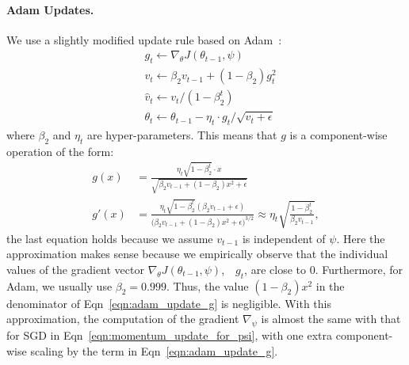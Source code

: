 \paragraph{Adam Updates.} We use a slightly modified update rule based on Adam~\citep{adam}:
\begin{equation}
  \label{eqn:adam_update}
  \begin{aligned}
    &g_t \leftarrow \nabla_\theta J(\theta_{t-1}, \psi) \\
    &v_t \leftarrow \beta_2 v_{t-1} + (1 - \beta_2) g_t^2 \\
    &\hat{v}_t \leftarrow v_t / (1 - \beta_2^t) \\
    &\theta_t \leftarrow \theta_{t-1} - \eta_t \cdot g_t / \sqrt{\hat{v}_t + \epsilon}
  \end{aligned}
\end{equation}
where $\beta_2$ and $\eta_t$ are hyper-parameters. This means that $g$ is a component-wise operation of the form:
\begin{equation}
  \label{eqn:adam_update_g}
  \begin{aligned}
    g(x) &= \frac{\eta_t \sqrt{1 - \beta_2^t} \cdot x}{\sqrt{\beta_2 v_{t-1} + (1 - \beta_2) x^2 + \epsilon}} \\
    g'(x) &= \frac{\eta_t \sqrt{1 - \beta_2^t} (\beta_2 v_{t-1} + \epsilon)}{\big( \beta_2 v_{t-1} + (1 - \beta_2) x^2 + \epsilon \big)^{3/2}} \approx \eta_t \sqrt{\frac{1 - \beta_2^t}{\beta_2 v_{t-1}}},  
  \end{aligned}
\end{equation}
the last equation holds because we assume $v_{t-1}$ is independent of $\psi$. Here the approximation makes sense because we empirically observe that the individual values of the gradient vector $\nabla_\theta J(\theta_{t-1}, \psi)$,~\ie~$g_t$, are close to $0$. Furthermore, for Adam, we usually use $\beta_2 = 0.999$. Thus, the value $(1 - \beta_2) x^2$ in the denominator of Eqn~\ref{eqn:adam_update_g} is negligible. With this approximation, the computation of the gradient $\nabla_\psi$ is almost the same with that for SGD in Eqn~\ref{eqn:momentum_update_for_psi}, with one extra component-wise scaling by the term in Eqn~\ref{eqn:adam_update_g}.

